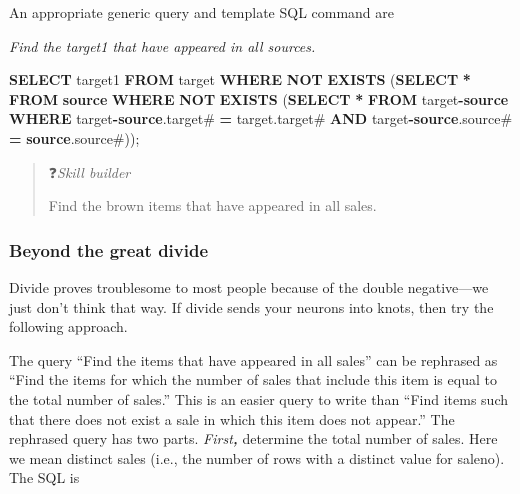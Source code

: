 \documentclass[
]{article}
\newenvironment{Shaded}{\begin{snugshade}}{\end{snugshade}}
\newcommand{\KeywordTok}[1]{\textcolor[rgb]{0.13,0.29,0.53}{\textbf{#1}}}
\newcommand{\NormalTok}[1]{#1}
\newcommand{\OperatorTok}[1]{\textcolor[rgb]{0.81,0.36,0.00}{\textbf{#1}}}
\begin{document}
An appropriate generic query and template SQL command are

\emph{Find the target1 that have appeared in all sources.}

\begin{Shaded}
\begin{Highlighting}[]
\KeywordTok{SELECT}\NormalTok{ target1 }\KeywordTok{FROM}\NormalTok{ target}
    \KeywordTok{WHERE} \KeywordTok{NOT} \KeywordTok{EXISTS}
\NormalTok{        (}\KeywordTok{SELECT} \OperatorTok{*} \KeywordTok{FROM} \KeywordTok{source}
            \KeywordTok{WHERE} \KeywordTok{NOT} \KeywordTok{EXISTS}
\NormalTok{                (}\KeywordTok{SELECT} \OperatorTok{*} \KeywordTok{FROM}\NormalTok{ target}\OperatorTok{{-}}\KeywordTok{source}
                    \KeywordTok{WHERE}\NormalTok{ target}\OperatorTok{{-}}\KeywordTok{source}\NormalTok{.target\# }\OperatorTok{=}\NormalTok{ target.target\#}
                    \KeywordTok{AND}\NormalTok{ target}\OperatorTok{{-}}\KeywordTok{source}\NormalTok{.source\# }\OperatorTok{=} \KeywordTok{source}\NormalTok{.source\#));}
\end{Highlighting}
\end{Shaded}

\begin{quote}
❓\emph{Skill builder}

Find the brown items that have appeared in all sales.
\end{quote}

\hypertarget{beyond-the-great-divide}{%
\subsubsection*{Beyond the great divide}\label{beyond-the-great-divide}}

Divide proves troublesome to most people because of the double negative---we just don't think that way. If divide sends your neurons into knots, then try the following approach.

The query ``Find the items that have appeared in all sales'' can be rephrased as ``Find the items for which the number of sales that include this item is equal to the total number of sales.'' This is an easier query to write than ``Find items such that there does not exist a sale in which this item does not appear.'' The rephrased query has two parts. \emph{First\textbf{,}} determine the total number of sales. Here we mean distinct sales (i.e., the number of rows with a distinct value for saleno). The SQL is
\end{document}
